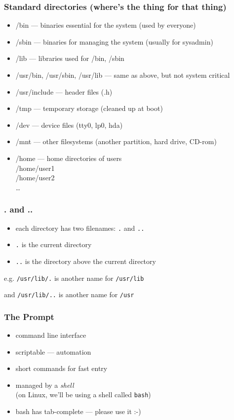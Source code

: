 \documentclass[%
        hyperref={%
                pdfauthor={Zakariyya Mughal},%
                pdfpagemode={None},pdfpagelayout={SinglePage}}%
        xcolor={x11names},%
]{beamer}
\begin{document}
\begin{frame}
	\frametitle{Standard directories (where's the thing for that thing)}
	\begin{itemize}
		\item /bin --- binaries essential for the system (used by everyone)
		\item /sbin --- binaries for managing the system (usually for sysadmin)
		\item /lib --- libraries used for /bin, /sbin
		\pause \item /usr/bin, /usr/sbin, /usr/lib --- same as
			above, but not system critical
		\pause \item /usr/include --- header files (.h)
		\pause \item /tmp --- temporary storage (cleaned up at boot)
		\item /dev --- device files (tty0, lp0, hda)
		\item /mnt --- other filesystems (another partition, hard drive, CD-rom)
		\pause \item /home --- home directories of users \\
			\pause \quad /home/user1 \\
			       \quad /home/user2 \\
			       \quad \ldots \\
	\end{itemize}
\end{frame}

\begin{frame}
	\frametitle{. and ..}
	\begin{itemize}
		\item each directory has two filenames: \texttt{.}
			and \texttt{..}
		\pause \item \texttt{.} is the current directory
		\pause \item \texttt{..} is the directory above the current directory
	\end{itemize}

	\pause e.g. \texttt{/usr/lib/.} is another name for \texttt{/usr/lib}

	\pause and \texttt{/usr/lib/..} is another name for \texttt{/usr}
\end{frame}

\begin{frame}
	\frametitle{The Prompt}
	\begin{itemize}
		\item command line interface
		\item scriptable --- automation
		\item short commands for fast entry
		\item managed by a \emph{shell} \\
			\quad (on Linux, we'll be using a shell called \texttt{bash})
		\pause\item bash has tab-complete \pause --- please use it :-)
	\end{itemize}
\end{frame}
\end{document}
